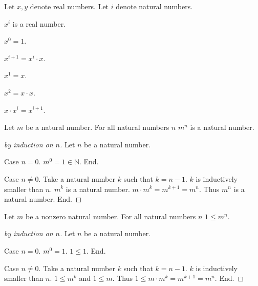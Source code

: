 \documentclass{article}
\begin{document}
\begin{forthel}
Let $x,y$ denote real numbers.
Let $i$ denote natural numbers.

\begin{signature} $x^{i}$ is a real number.
\end{signature}

\begin{axiom} $x^{0} = 1$. \end{axiom}

\begin{axiom} $x^{i+1} = x^{i} \cdot x$.
\end{axiom}

\begin{lemma}
$x^{1} = x$.
\end{lemma}

\begin{lemma}
$x^{2} = x \cdot x$.
\end{lemma}

\begin{lemma}
$x \cdot x^{i} = x^{i+1}$.
\end{lemma}

\begin{lemma}
Let $m$ be a natural number.
For all natural numbers $n$ $m^{n}$ is a natural number.
\end{lemma}
\begin{proof}[by induction on $n$]
Let $n$ be a natural number.

Case $n = 0$. $m^{0} = 1 \in \mathbb{N}$. End.

Case $n \neq 0$. Take a natural number $k$ such that $k = n - 1$. $k$ is inductively smaller than $n$.
$m^{k}$ is a natural number. $m \cdot m^{k} = m^{k + 1} = m^{n}$. Thus $m^{n}$ is a natural number. End.
\end{proof}

\begin{lemma}
Let $m$ be a nonzero natural number.
For all natural numbers $n$ $1 \leq m^{n}$.
\end{lemma}
\begin{proof}[by induction on $n$]
Let $n$ be a natural number.

Case $n = 0$. $m^{0} = 1$. $1 \leq 1$. End.

Case $n \neq 0$. Take a natural number $k$ such that $k = n - 1$. $k$ is inductively smaller than $n$.
$1 \leq m^{k}$ and $1 \leq m$. Thus $1 \leq m \cdot m^{k} = m^{k + 1} = m^{n}$. End.
\end{proof}

\end{forthel}
\end{document}
